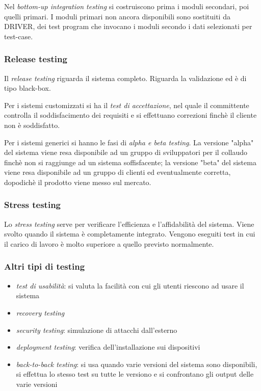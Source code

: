 \documentclass[11pt]{article}
\begin{document}
Nel \textit{bottom-up integration testing} si costruiscono prima i moduli secondari, poi quelli primari. I moduli primari 
non ancora disponibili sono sostituiti da DRIVER, dei test program che invocano i moduli secondo i dati selezionati per 
test-case.
\subsubsection*{Release testing}
Il \textit{release testing} riguarda il sistema completo. Riguarda la validazione ed è di tipo black-box.

Per i sistemi customizzati si ha il \textit{test di accettazione}, nel quale il committente controlla il soddisfacimento 
dei requisiti e si effettuano correzioni finchè il cliente non è soddisfatto.

Per i sistemi generici si hanno le fasi di \textit{alpha e beta testing}. La versione "alpha" del sistema viene resa 
disponibile ad un gruppo di sviluppatori per il collaudo finchè non si raggiunge ad un sistema soffisfacente; la versione 
"beta" del sistema viene resa disponibile ad un gruppo di clienti ed eventualmente corretta, dopodichè il prodotto viene 
messo sul mercato.
\subsubsection*{Stress testing}
Lo \textit{stress testing} serve per verificare l'efficienza e l'affidabilità del sistema. Viene svolto quando il sistema 
è completamente integrato. Vengono eseguiti test in cui il carico di lavoro è molto superiore a quello previsto normalmente.
\subsubsection*{Altri tipi di testing}
\begin{itemize}
    \item \textit{test di usabilità}: si valuta la facilità con cui gli utenti riescono ad usare il sistema 
    \item \textit{recovery testing}
    \item \textit{security testing}: simulazione di attacchi dall'esterno 
    \item \textit{deployment testing}: verifica dell'installazione sui dispositivi
    \item \textit{back-to-back testing}: si usa quando varie versioni del sistema sono disponibili, si effettua lo stesso 
    test su tutte le versiono e si confrontano gli output delle varie versioni
\end{itemize}
\end{document}

